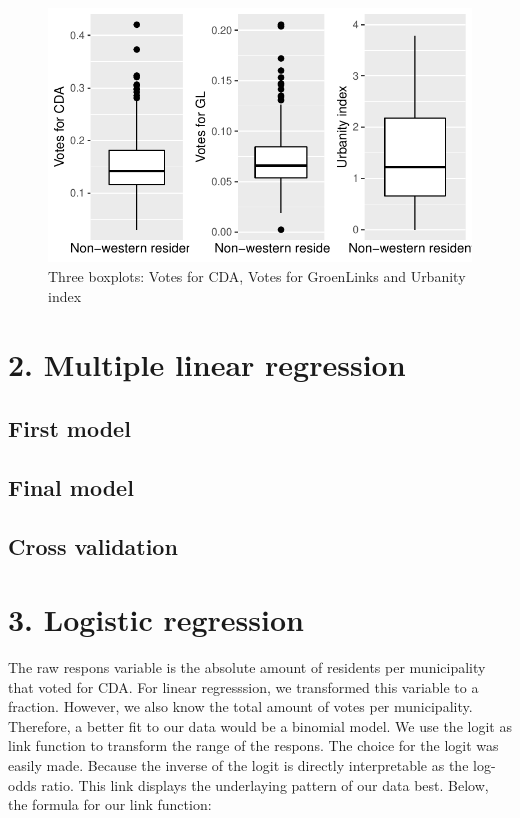 \documentclass[11pt,]{article}
\begin{document}
\begin{figure}[H]

{\centering \includegraphics{Report_files/figure-latex/unnamed-chunk-8-1} 

}

\caption{\label{6}Three boxplots: Votes for CDA, Votes for GroenLinks and Urbanity index}\label{fig:unnamed-chunk-8}
\end{figure}

\section{2. Multiple linear
regression}\label{multiple-linear-regression}

\subsection{First model}\label{first-model}

\subsection{Final model}\label{final-model}

\subsection{Cross validation}\label{cross-validation}

\section{3. Logistic regression}\label{logistic-regression}

The raw respons variable is the absolute amount of residents per
municipality that voted for CDA. For linear regresssion, we transformed
this variable to a fraction. However, we also know the total amount of
votes per municipality. Therefore, a better fit to our data would be a
binomial model. We use the logit as link function to transform the range
of the respons. The choice for the logit was easily made. Because the
inverse of the logit is directly interpretable as the log-odds ratio.
This link displays the underlaying pattern of our data best. Below, the
formula for our link function:
\end{document}
